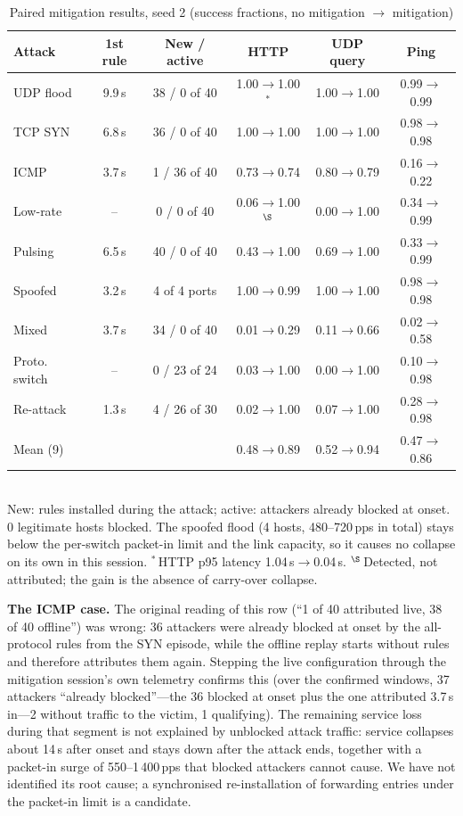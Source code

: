 \documentclass[conference]{IEEEtran}
\begin{document}
\begin{table}[t]
\caption{Paired mitigation results, seed 2 (success fractions, no mitigation $\to$ mitigation)}
\label{tab:mitig}
\centering
\setlength{\tabcolsep}{2.0pt}
\begin{tabular}{lccccc}
\toprule
Attack & 1st rule & New / active & HTTP & UDP query & Ping \\
\midrule
UDP flood & 9.9\,s & 38 / 0 of 40 & 1.00$\to$1.00$^*$ & 1.00$\to$1.00 & 0.99$\to$0.99 \\
TCP SYN & 6.8\,s & 36 / 0 of 40 & 1.00$\to$1.00 & 1.00$\to$1.00 & 0.98$\to$0.98 \\
ICMP & 3.7\,s & 1 / 36 of 40 & 0.73$\to$0.74 & 0.80$\to$0.79 & 0.16$\to$0.22 \\
Low-rate & -- & 0 / 0 of 40 & 0.06$\to$1.00$^\S$ & 0.00$\to$1.00 & 0.34$\to$0.99 \\
Pulsing & 6.5\,s & 40 / 0 of 40 & 0.43$\to$1.00 & 0.69$\to$1.00 & 0.33$\to$0.99 \\
Spoofed & 3.2\,s & 4 of 4 ports & 1.00$\to$0.99 & 1.00$\to$1.00 & 0.98$\to$0.98 \\
Mixed & 3.7\,s & 34 / 0 of 40 & 0.01$\to$0.29 & 0.11$\to$0.66 & 0.02$\to$0.58 \\
Proto. switch & -- & 0 / 23 of 24 & 0.03$\to$1.00 & 0.00$\to$1.00 & 0.10$\to$0.98 \\
Re-attack & 1.3\,s & 4 / 26 of 30 & 0.02$\to$1.00 & 0.07$\to$1.00 & 0.28$\to$0.98 \\
\midrule
Mean (9) & & & 0.48$\to$0.89 & 0.52$\to$0.94 & 0.47$\to$0.86 \\
\bottomrule
\end{tabular}\\[2pt]
\footnotesize New: rules installed during the attack; active: attackers already blocked at onset. 0 legitimate hosts blocked. The spoofed flood (4 hosts, 480--720\,pps in total) stays below the per-switch packet-in limit and the link capacity, so it causes no collapse on its own in this session. $^*$\,HTTP p95 latency 1.04\,s$\to$0.04\,s. $^\S$\,Detected, not attributed; the gain is the absence of carry-over collapse.
\end{table}

\textbf{The ICMP case.} The original reading of this row (``1 of 40 attributed live, 38 of 40 offline'') was wrong: 36 attackers were already blocked at onset by the all-protocol rules from the SYN episode, while the offline replay starts without rules and therefore attributes them again. Stepping the live configuration through the mitigation session's own telemetry confirms this (over the confirmed windows, 37 attackers ``already blocked''---the 36 blocked at onset plus the one attributed 3.7\,s in---2 without traffic to the victim, 1 qualifying). The remaining service loss during that segment is not explained by unblocked attack traffic: service collapses about 14\,s after onset and stays down after the attack ends, together with a packet-in surge of 550--1\,400\,pps that blocked attackers cannot cause. We have not identified its root cause; a synchronised re-installation of forwarding entries under the packet-in limit is a candidate.
\end{document}
